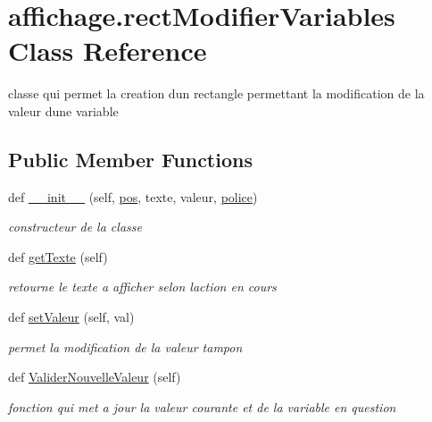 \hypertarget{classaffichage_1_1rect_modifier_variables}{}\section{affichage.\+rect\+Modifier\+Variables Class Reference}
\label{classaffichage_1_1rect_modifier_variables}


classe qui permet la creation d\textquotesingle{}un rectangle permettant la modification de la valeur d\textquotesingle{}une variable  


\subsection*{Public Member Functions}
\begin{DoxyCompactItemize}
\item 
def \hyperlink{classaffichage_1_1rect_modifier_variables_a78aabf048c2468f100bcfa15ab48ec56}{\+\_\+\+\_\+init\+\_\+\+\_\+} (self, \hyperlink{classaffichage_1_1rect_modifier_variables_a35d142e0546decd4b8a60133a8d8687f}{pos}, texte, valeur, \hyperlink{classaffichage_1_1rect_modifier_variables_a1d316c60225d933527e6e94ce5c87515}{police})
\begin{DoxyCompactList}\small\item\em constructeur de la classe \end{DoxyCompactList}\item 
def \hyperlink{classaffichage_1_1rect_modifier_variables_a7be1daba962628cf305415a2e4ec3312}{get\+Texte} (self)
\begin{DoxyCompactList}\small\item\em retourne le texte a afficher selon l\textquotesingle{}action en cours \end{DoxyCompactList}\item 
def \hyperlink{classaffichage_1_1rect_modifier_variables_a1f00100e600680e9498960f94e519948}{set\+Valeur} (self, val)
\begin{DoxyCompactList}\small\item\em permet la modification de la valeur tampon \end{DoxyCompactList}\item 
def \hyperlink{classaffichage_1_1rect_modifier_variables_a3593e171bfa0f5f4cc668ac9d75698f0}{Valider\+Nouvelle\+Valeur} (self)
\begin{DoxyCompactList}\small\item\em fonction qui met a jour la valeur courante et de la variable en question \end{DoxyCompactList}\item 

\end{DoxyCompactItemize}
